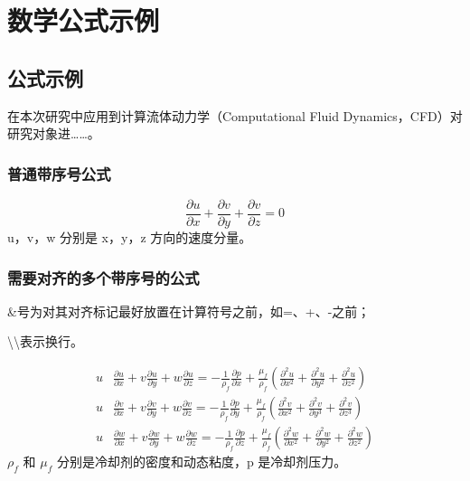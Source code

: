 
\chapter{数学公式示例}\label{ch:3}

\section{公式示例}
在本次研究中应用到计算流体动力学（Computational Fluid Dynamics，CFD）对研究对象进……。


\subsection{普通带序号公式}
\begin{equation}
    \frac{\partial u}{\partial x}+\frac{\partial v}{\partial y}+\frac{\partial v}{\partial z}=0
\end{equation}
u，v，w 分别是 x，y，z 方向的速度分量。


\subsection{需要对齐的多个带序号的公式}

\&号为对其对齐标记最好放置在计算符号之前，如=、+、-之前；

\textbackslash\textbackslash 表示换行。

\begin{align}%
    u & \frac{\partial u}{\partial x}+v \frac{\partial u}{\partial y}+w \frac{\partial u}{\partial z}=-\frac{1}{\rho_{f}} \frac{\partial p}{\partial x}+\frac{\mu_{f}}{\rho_{f}}\left(\frac{\partial^{2} u}{\partial x^{2}}+\frac{\partial^{2} u}{\partial y^{2}}+\frac{\partial^{2} u}{\partial z^{2}}\right) \\
    u & \frac{\partial v}{\partial x}+v \frac{\partial v}{\partial y}+w \frac{\partial v}{\partial z}=-\frac{1}{\rho_{f}} \frac{\partial p}{\partial y}+\frac{\mu_{f}}{\rho_{f}}\left(\frac{\partial^{2} v}{\partial x^{2}}+\frac{\partial^{2} v}{\partial y^{3}}+\frac{\partial^{2} v}{\partial z^{3}}\right) \\
    u & \frac{\partial w}{\partial x}+v \frac{\partial w}{\partial y}+w \frac{\partial w}{\partial z}=-\frac{1}{\rho_{f}} \frac{\partial p}{\partial z}+\frac{\mu_{f}}{\rho_{f}}\left(\frac{\partial^{2} w}{\partial x^{2}}+\frac{\partial^{2} w}{\partial y^{2}}+\frac{\partial^{2} w}{\partial z^{2}}\right)
\end{align}
$\rho_{f}$ 和 $\mu_{f}$ 分别是冷却剂的密度和动态粘度，p 是冷却剂压力。


